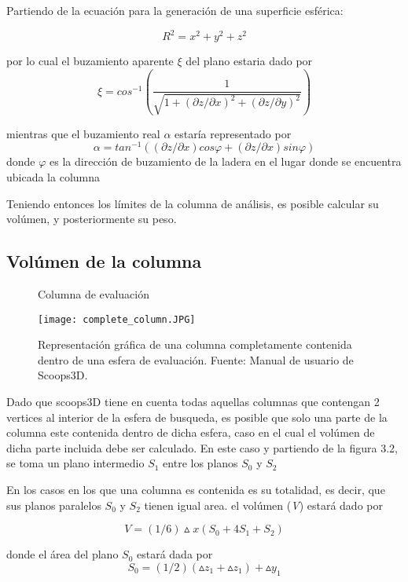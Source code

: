 Partiendo de la ecuaci\'on para la generaci\'on de una superficie esf\'erica:

$$ \textit{R}^{2} = \textit{x}^{2} + \textit{y}^{2} + \textit{z}^{2}$$

por lo cual el buzamiento aparente $\xi$ del plano estaria dado por
$$ \xi = \textit{cos}^{-1}  (\dfrac{1}{\sqrt{1+(\partial z/ \partial x)^{2} + (\partial z/ \partial y)^{2} }})   $$

mientras que el buzamiento real $ \alpha$ estar\'ia representado por \\
$$ \alpha = tan^{-1} ((\partial z/ \partial x)\textit{cos}\varphi +(\partial z/ \partial x)\textit{sin}\varphi )  $$
donde $\varphi$ es la direcci\'on de buzamiento de la ladera en el lugar donde se encuentra ubicada la columna

Teniendo entonces los l\'imites de la columna de an\'alisis, es posible calcular su vol\'umen, y posteriormente su peso.\cite{formulas}

\subsection{Vol\'umen de la columna}



\begin{figure}[h]
\caption{Columna de evaluaci\'on}
\centering
\texttt{[image: complete\_column.JPG]}
\caption{Representaci\'on gr\'afica de una columna completamente contenida dentro de una esfera de evaluaci\'on. Fuente: Manual de usuario de Scoops3D. \cite{columngraph}  }
\label{fig:failure-plane}
\end{figure}

Dado que scoops3D tiene en cuenta todas aquellas columnas que contengan 2 vertices al interior de la esfera de busqueda, es posible que solo una parte de la columna este contenida dentro de dicha esfera, caso en el cual el vol\'umen de dicha parte incluida debe ser calculado.
En este caso y partiendo de la figura 3.2, se toma un plano intermedio $ S_{1} $ entre los planos $ S_{0} $ y $ S_{2} $

En los casos en los que una columna es contenida es su totalidad, es decir, que sus planos paralelos $S_{0}$ y $S_{2}$ tienen igual area. el vol\'umen (\textit{V}) estar\'a dado por

$$\textit{V}= (1/6)\vartriangle \textit{x}(S_{0} + 4S_{1} + S_{2})$$

donde el \'area del plano $\textit{S}_{0}$ estar\'a dada por
$$ \textit{S}_{0} = (1/2)(\vartriangle z_{1} +\vartriangle z_{1})+\vartriangle \textit{y}_{1}  $$

